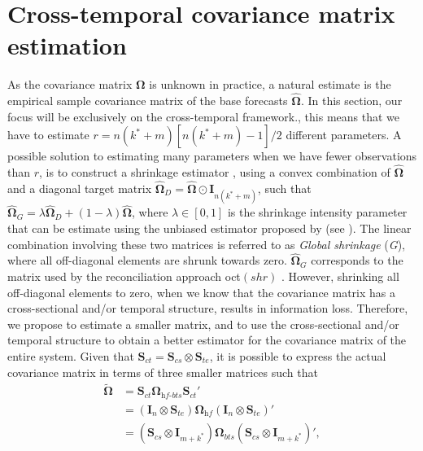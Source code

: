 \documentclass[a4paper,11pt]{article}
\newcommand{\Ivet}{\bm{I}}
\newcommand{\Svet}{\bm{S}}
\newcommand{\Omegavet}{\bm{\Omega}}
\theoremstyle{definition}
\begin{document}
\section{Cross-temporal covariance matrix estimation}\label{sec:shrtech}

As the covariance matrix $\Omegavet$ is unknown in practice, a natural estimate is the empirical sample covariance matrix of the base forecasts $\widehat{\Omegavet}$. In this section, our focus will be exclusively on the cross-temporal framework., this means that we have to estimate $r = n(k^\ast+m)[n(k^\ast+m)-1]/2$ different parameters. A possible solution to estimating many parameters when we have fewer observations than $r$, is to construct a shrinkage estimator \citep{efron1975a,efron1975,efron1977}, using a convex combination of $\widehat{\Omegavet}$ and a diagonal target matrix $\widehat{\Omegavet}_D = \widehat{\Omegavet} \odot \Ivet_{n(k^\ast+m)}$, such that $\widehat{\Omegavet}_{G} = \lambda \widehat{\Omegavet}_D + (1-\lambda) \widehat{\Omegavet}$, where $\lambda \in [0,1]$ is the shrinkage intensity parameter that can be estimate using the unbiased estimator proposed by \cite{ledoit2004a} (see \citealp{schafer2005}). The linear combination involving these two matrices is referred to as \textit{Global shrinkage} (\textit{G}), where all off-diagonal elements are shrunk towards zero. $\widehat{\Omegavet}_{G}$ corresponds to the matrix used by the reconciliation approach oct$(shr)$ \citep{difonzo2023}. However, shrinking all off-diagonal elements to zero, when we know that the covariance matrix has a cross-sectional and/or temporal structure, results in information loss. Therefore, we propose to estimate a smaller matrix, and to use the cross-sectional and/or temporal structure to obtain a better estimator for the covariance matrix of the entire system. Given that $\Svet_{ct} = \Svet_{cs} \otimes \Svet_{te}$, it is possible to express the actual covariance matrix in terms of three smaller matrices such that
\begin{equation}\label{eq:OmSct}
\begin{aligned}
\widetilde{\Omegavet} &= \Svet_{ct}\Omegavet_{\textit{hf-bts}}\Svet_{ct}' \\
	&= \left(\Ivet_n \otimes \Svet_{te}\right)\Omegavet_{\textit{hf}}\left(\Ivet_n \otimes \Svet_{te}\right)' \\
	&= \left(\Svet_{cs} \otimes \Ivet_{m+k^\ast}\right)\Omegavet_{bts}\left(\Svet_{cs} \otimes \Ivet_{m+k^\ast}\right)',
\end{aligned}
\end{equation}
\end{document}
